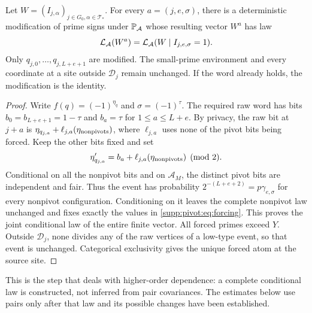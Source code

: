 \begin{proposition}\label{supp:pivot:prop:forcing}\label{C-PALM-FORCING}
Let $W=(I_{j,\alpha})_{j\in G_0,\alpha\in\mathcal T_*}$.
For every $a=(j,e,\sigma)$, there is a deterministic modification of prime signs under $\mathbb P_{\mathcal A}$ whose resulting vector $W^a$ has law
\[
 \mathcal L_{\mathcal A}(W^a)=\mathcal L_{\mathcal A}(W\mid I_{j,e,\sigma}=1).
\]
Only $q_{j,0},\ldots,q_{j,L+e+1}$ are modified. The small-prime environment and every coordinate at a site outside $\mathscr D_j$ remain unchanged. If the word already holds, the modification is the identity.
\end{proposition}
\begin{proof}
Write $f(q)=(-1)^{\eta_q}$ and $\sigma=(-1)^\tau$.
The required raw word has bits
$b_0=b_{L+e+1}=1-\tau$ and $b_a=\tau$ for $1\le a\le L+e$.
By privacy, the raw bit at $j+a$ is
$\eta_{q_{j,a}}+\ell_{j,a}(\eta_{\rm nonpivots})$, where $\ell_{j,a}$ uses none of the pivot bits being forced. Keep the other bits fixed and set
\begin{equation}\label{supp:pivot:eq:forcing}
 \eta'_{q_{j,a}}=b_a+\ell_{j,a}(\eta_{\rm nonpivots})\pmod2.
\end{equation}
Conditional on all the nonpivot bits and on $\mathcal A_M$, the distinct pivot bits are independent and fair. Thus the event has probability
$2^{-(L+e+2)}=p\gamma_{e,\sigma}$ for every nonpivot configuration. Conditioning on it leaves the complete nonpivot law unchanged and fixes exactly the values in \eqref{supp:pivot:eq:forcing}. This proves the joint conditional law of the entire finite vector.
All forced primes exceed $Y$. Outside $\mathscr D_j$, none divides any of the raw vertices of a low-type event, so that event is unchanged. Categorical exclusivity gives the unique forced atom at the source site.
\end{proof}

This is the step that deals with higher-order dependence: a complete conditional law is constructed, not inferred from pair covariances. The estimates below use pairs only after that law and its possible changes have been established.


